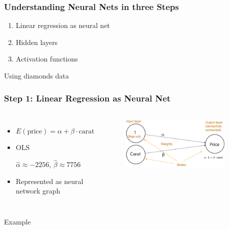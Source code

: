 \documentclass[
    utf8,
    aspectratio=169
]{beamer}  %
\begin{document}
\begin{frame}
	\frametitle{Understanding Neural Nets in three Steps}
	\begin{enumerate}
		\item Linear regression as neural net
		\item Hidden layers
		\item Activation functions
	\end{enumerate}

	\vfill
	
	Using \alert{diamonds} data
\end{frame}

\begin{frame}
	\frametitle{Step 1: Linear Regression as Neural Net}
	\begin{columns}
		\begin{itemize}
			\item $E(\text{price})=\alpha+\beta \cdot \text{carat}$
			\item OLS 
			
			$\hat\alpha \approx -2256$, $\hat\beta \approx 7756$
			\item Represented as neural network graph
		\end{itemize}
		\begin{figure}
		\includegraphics[width=0.9\textwidth]{pics/simple_nn.png}
	\end{figure}
	\end{columns}
	
	\vfill

	\begin{exampleblock}{\centering Example}
	\end{exampleblock}
\end{frame}
\end{document}
